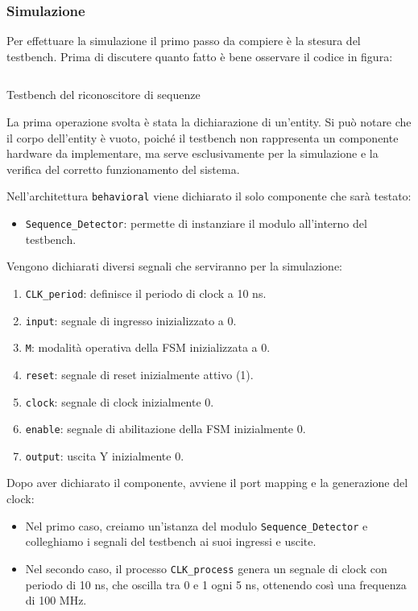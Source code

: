 \subsubsection{Simulazione}
Per effettuare la simulazione il primo passo da compiere è la stesura del testbench. Prima di discutere quanto fatto è bene osservare il codice in figura:

\begin{code}
    \inputminted{vhdl}{vhdl/Sequence_Detector_tb.vhd}
    \caption{Testbench del riconoscitore di sequenze}
    \label{cod:sequence_detector_tb}
\end{code}

La prima operazione svolta è stata la dichiarazione di un’entity. Si può notare che il corpo dell’entity è vuoto, poiché il testbench non rappresenta un componente hardware da implementare, ma serve esclusivamente per la simulazione e la verifica del corretto funzionamento del sistema.

Nell’architettura \texttt{behavioral} viene dichiarato il solo componente che sarà testato:

\begin{itemize}
    \item \texttt{Sequence\_Detector}: permette di instanziare il modulo all'interno del testbench.
\end{itemize}

Vengono dichiarati diversi segnali che serviranno per la simulazione:

\begin{enumerate}
    \item \texttt{CLK\_period}: definisce il periodo di clock a 10 ns.
    \item \texttt{input}: segnale di ingresso inizializzato a 0.
    \item \texttt{M}: modalità operativa della FSM inizializzata a 0.
    \item \texttt{reset}: segnale di reset inizialmente attivo (1).
    \item \texttt{clock}: segnale di clock inizialmente 0.
    \item \texttt{enable}: segnale di abilitazione della FSM inizialmente 0.
    \item \texttt{output}: uscita Y inizialmente 0.
\end{enumerate}

Dopo aver dichiarato il componente, avviene il port mapping e la generazione del clock:

\begin{itemize}
    \item Nel primo caso, creiamo un'istanza del modulo \texttt{Sequence\_Detector} e colleghiamo i segnali del testbench ai suoi ingressi e uscite.
    \item Nel secondo caso, il processo \texttt{CLK\_process} genera un segnale di clock con periodo di 10 ns, che oscilla tra 0 e 1 ogni 5 ns, ottenendo così una frequenza di 100 MHz.
\end{itemize}

